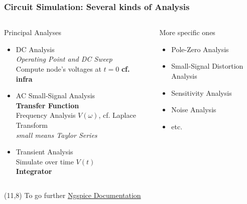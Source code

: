 \begin{frame}
  \frametitle{Circuit Simulation: Several kinds of Analysis}
  \begin{columns}
    \begin{column}[t]{.6\textwidth}
      Principal Analyses \\[1em]
      \begin{itemize}
      \item DC Analysis \\
        \textit{Operating Point and DC Sweep} \\
        Compute node's voltages at $t=0$
        \textbf{cf. infra} \\[1em]
      \item AC Small-Signal Analysis \\
        \textbf{Transfer Function} \\
        Frequency Analysis $V(\omega)$, cf. Laplace Transform \\
        \textit{small means Taylor Series} \\[1em]
      \item Transient Analysis \\
        Simulate over time $V(t)$ \\
        \textbf{Integrator}
      \end{itemize}
    \end{column}
    \begin{column}[t]{.4\textwidth}
      More specific ones \\[1em]
      \begin{itemize}
      \item Pole-Zero Analysis
      \item Small-Signal Distortion Analysis
      \item Sensitivity Analysis
      \item Noise Analysis
      \item etc.\@
      \end{itemize}
    \end{column}
  \end{columns}
  \begin{textblock}{6}(11,8)
    {\tiny
      To go further \href{http://ngspice.sourceforge.net/docs.html}{Ngspice Documentation}
    }
  \end{textblock}
\end{frame}

